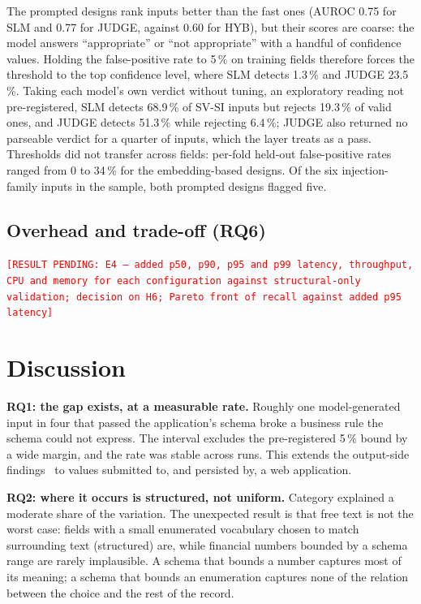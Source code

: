\documentclass[conference]{IEEEtran}
\newcommand{\pending}[1]{\textcolor{red}{\texttt{[RESULT PENDING: #1]}}}
\begin{document}
The prompted designs rank inputs better than the fast ones (AUROC 0.75 for SLM and 0.77 for JUDGE,
against 0.60 for HYB), but their scores are coarse: the model answers ``appropriate'' or
``not appropriate'' with a handful of confidence values. Holding the false-positive rate to 5\,\% on
training fields therefore forces the threshold to the top confidence level, where SLM detects 1.3\,\%
and JUDGE 23.5\,\%. Taking each model's own verdict without tuning, an exploratory reading not
pre-registered, SLM detects 68.9\,\% of SV-SI inputs but rejects 19.3\,\% of valid ones, and JUDGE
detects 51.3\,\% while rejecting 6.4\,\%; JUDGE also returned no parseable verdict for a quarter of
inputs, which the layer treats as a pass. Thresholds did not transfer across fields: per-fold
held-out false-positive rates ranged from 0 to 34\,\% for the embedding-based designs. Of the six
injection-family inputs in the sample, both prompted designs flagged five.

\subsection{Overhead and trade-off (RQ6)}
\pending{E4 --- added p50, p90, p95 and p99 latency, throughput, CPU and memory for each
configuration against structural-only validation; decision on H6; Pareto front of recall against
added p95 latency}

\section{Discussion}
\label{sec:discussion}

\textbf{RQ1: the gap exists, at a measurable rate.} Roughly one model-generated input in four that
passed the application's schema broke a business rule the schema could not express. The interval
excludes the pre-registered 5\,\% bound by a wide margin, and the rate was stable across runs. This
extends the output-side findings~\cite{li2026orderbench,singh2026sob,wrenn2026enterprise} to values
submitted to, and persisted by, a web application.

\textbf{RQ2: where it occurs is structured, not uniform.} Category explained a moderate share of the
variation. The unexpected result is that free text is not the worst case: fields with a small
enumerated vocabulary chosen to match surrounding text (structured) are, while financial numbers
bounded by a schema range are rarely implausible. A schema that bounds a number captures most of its
meaning; a schema that bounds an enumeration captures none of the relation between the choice and
the rest of the record.
\end{document}
